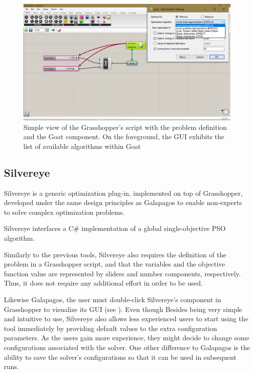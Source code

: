 \begin{figure}
	\centering
	\includegraphics[width=1\textwidth]{Images/Background/Goat/general-view.png}
	\caption[Goat GUI]{Simple view of the Grasshopper's script with the problem definition and the Goat component. On the foreground, the \ac{GUI} exhibits the list of available algorithms within Goat}
	\label{fig:goat}
\end{figure}
	

\subsection{Silvereye}
Silvereye \cite{Cichocka2017SILVEREYE} is a generic optimization plug-in, implemented on top of Grasshopper, developed under the same design principles as Galapagos to enable non-experts to solve complex optimization problems. 

Silvereye interfaces a C\# implementation of a global single-objective \ac{PSO} algorithm.

Similarly to the previous tools, Silvereye also requires the definition of the problem in a Grasshopper script, and that the variables and the objective function value are represented by sliders and number components, respectively. Thus, it does not require any additional effort in order to be used.

Likewise Galapagos, the user must double-click Silvereye's component in Grasshopper to visualize its \ac{GUI} (see ). Even though Besides being very simple and intuitive to use, Silvereye also allows less experienced users to start using the tool immediately by providing default values to the extra configuration parameters. As the users gain more experience, they might decide to change some configurations associated with the solver. One other difference to Galapagos is the ability to save the solver's configurations so that it can be used in subsequent runs.

